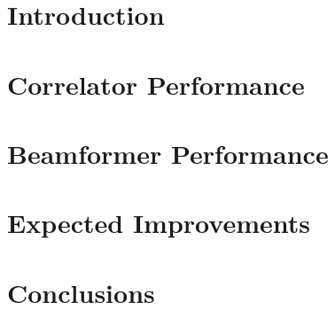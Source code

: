 \documentclass{report}
\begin{document}
\section{Introduction}
\section{Correlator Performance}
\section{Beamformer Performance}
\section{Expected Improvements}
\section{Conclusions}
\end{document}

